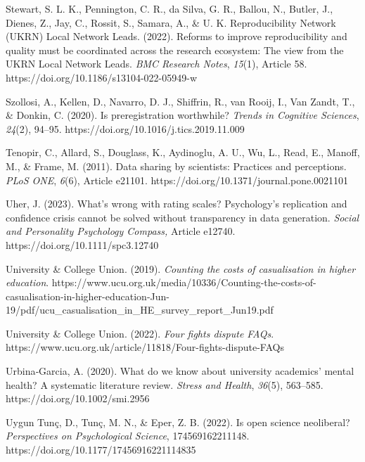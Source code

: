 \documentclass[meta, authordate]{jote-new-article}
\begin{document}
Stewart, S. L. K., Pennington, C. R., da Silva, G. R., Ballou, N., Butler, J., Dienes, Z., Jay, C., Rossit, S., Samara, A., & U. K. Reproducibility Network (UKRN) Local Network Leads. (2022). Reforms to improve reproducibility and quality must be coordinated across the research ecosystem: The view from the UKRN Local Network Leads. \emph{BMC Research Notes}, \emph{15}(1), Article 58. https://doi.org/10.1186/s13104-022-05949-w



Szollosi, A., Kellen, D., Navarro, D. J., Shiffrin, R., van Rooij, I., Van Zandt, T., & Donkin, C. (2020). Is preregistration worthwhile? \emph{Trends in Cognitive Sciences}, \emph{24}(2), 94–95. https://doi.org/10.1016/j.tics.2019.11.009



Tenopir, C., Allard, S., Douglass, K., Aydinoglu, A. U., Wu, L., Read, E., Manoff, M., & Frame, M. (2011). Data sharing by scientists: Practices and perceptions. \emph{PLoS ONE}, \emph{6}(6), Article e21101. https://doi.org/10.1371/journal.pone.0021101



Uher, J. (2023). What’s wrong with rating scales? Psychology’s replication and confidence crisis cannot be solved without transparency in data generation. \emph{Social and Personality Psychology Compass, }Article\emph{ }e12740. https://doi.org/10.1111/spc3.12740



University & College Union. (2019). \emph{Counting the costs of casualisation in higher education}. https://www.ucu.org.uk/media/10336/Counting-the-costs-of-casualisation-in-higher-education-Jun-19/pdf/ucu_casualisation_in_HE_survey_report_Jun19.pdf



University & College Union. (2022). \emph{Four fights dispute FAQs}. https://www.ucu.org.uk/article/11818/Four-fights-dispute-FAQs



Urbina‐Garcia, A. (2020). What do we know about university academics’ mental health? A systematic literature review. \emph{Stress and Health}, \emph{36}(5), 563–585. https://doi.org/10.1002/smi.2956



Uygun Tunç, D., Tunç, M. N., & Eper, Z. B. (2022). Is open science neoliberal? \emph{Perspectives on Psychological Science}, 174569162211148. https://doi.org/10.1177/17456916221114835
\end{document}
